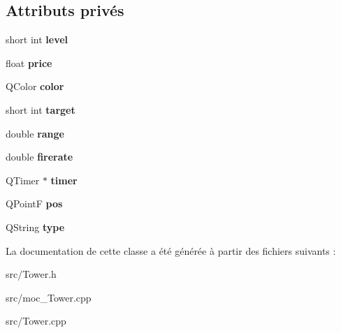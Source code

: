 \subsection*{Attributs privés}
\begin{DoxyCompactItemize}
\item 
\hypertarget{classTower_a4a719d8065544dd9e0285424cae755bb}{
short int {\bfseries level}}
\label{classTower_a4a719d8065544dd9e0285424cae755bb}

\item 
\hypertarget{classTower_ab0899f8dc1ce4d15d9c27df3c3a9609d}{
float {\bfseries price}}
\label{classTower_ab0899f8dc1ce4d15d9c27df3c3a9609d}

\item 
\hypertarget{classTower_abd813990a1ae3b4300a54b38db0e1c51}{
QColor {\bfseries color}}
\label{classTower_abd813990a1ae3b4300a54b38db0e1c51}

\item 
\hypertarget{classTower_ab5ae05a738ce7598dc676b2a5fcae5f7}{
short int {\bfseries target}}
\label{classTower_ab5ae05a738ce7598dc676b2a5fcae5f7}

\item 
\hypertarget{classTower_a435abff8e426dcff8d0650f663417a71}{
double {\bfseries range}}
\label{classTower_a435abff8e426dcff8d0650f663417a71}

\item 
\hypertarget{classTower_a69f1f60ed131995bc50600bd5e53271e}{
double {\bfseries firerate}}
\label{classTower_a69f1f60ed131995bc50600bd5e53271e}

\item 
\hypertarget{classTower_a7de2dee4f15ecea10d4945073ebde6f0}{
QTimer $\ast$ {\bfseries timer}}
\label{classTower_a7de2dee4f15ecea10d4945073ebde6f0}

\item 
\hypertarget{classTower_a2e31b99355d221706b6ec16459c4c0a1}{
QPointF {\bfseries pos}}
\label{classTower_a2e31b99355d221706b6ec16459c4c0a1}

\item 
\hypertarget{classTower_a94a20f8350f5f56015216ce4c81a41f7}{
QString {\bfseries type}}
\label{classTower_a94a20f8350f5f56015216ce4c81a41f7}

\end{DoxyCompactItemize}


La documentation de cette classe a été générée à partir des fichiers suivants :\begin{DoxyCompactItemize}
\item 
src/Tower.h\item 
src/moc\_\-Tower.cpp\item 
src/Tower.cpp\end{DoxyCompactItemize}
